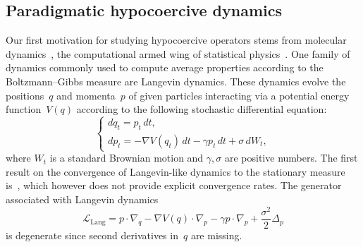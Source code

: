 \documentclass[10pt]{amsart}
\theoremstyle{definition}\newtheorem{defi}[theo]{Definition}\newtheorem{rema}[theo]{Remark}\newtheorem{exam}[theo]{Example}\newtheorem{exem}[theo]{Example}\newtheorem{nota}[theo]{Notation}
\newcommand{\Lang}{\mathrm{Lang}}
\newcommand{\cL}{\mathcal{L}}
\begin{document}
\subsection*{Paradigmatic hypocoercive dynamics}
Our first motivation for studying hypocoercive operators stems from molecular dynamics~\cite{FrenkelSmit,LM15,LS16,Tuckerman}, the computational armed wing of statistical physics~\cite{Balian}. One family of dynamics commonly used to compute average properties according to the Boltzmann--Gibbs measure are Langevin dynamics. These dynamics evolve the positions~$q$ and momenta~$p$ of given particles interacting via a potential energy function~$V(q)$ according to the following stochastic differential equation:
\[
\begin{cases}
dq_t  = p_t \, dt,\\
dp_t  = -\nabla V(q_t) \, dt - \gamma p_t \, dt + \sigma \, dW_t,
\end{cases}
\]
where $W_t$ is a standard Brownian motion and $\gamma,\sigma$ are positive numbers. The first result on the convergence of Langevin-like dynamics to the stationary measure is~\cite{Tropper77}, which however does not provide explicit convergence rates. The generator associated with Langevin dynamics
\[
\cL_{\Lang} = p \cdot \nabla_q - \nabla V(q) \cdot \nabla_p - \gamma p \cdot \nabla_p + \frac{\sigma^2}{2} \Delta_p
\]
is degenerate since second derivatives in~$q$ are missing.
\end{document}
